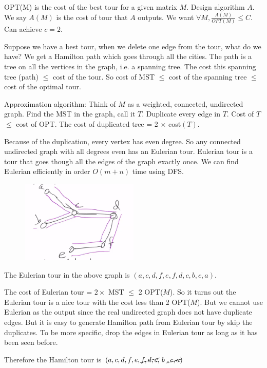 OPT(M) is the cost of the best tour for a given matrix $M$. Design algorithm $A$. We say $A(M)$ is the cost of tour that $A$ outputs. We want $\forall M, \frac{A(M)}{OPT(M)} \le C$. Can achieve $c = 2$.

Suppose we have a best tour, when we delete one edge from the tour, what do we have? We get a Hamilton path which goes through all the cities. The path is a tree on all the vertices in the graph, i.e. a spanning tree. The cost this spanning tree (path) $\le$ cost of the tour. So cost of MST $\le$ cost of the spanning tree $\le$ cost of the optimal tour.

Approximation algorithm:
Think of $M$ as a weighted, connected,  undirected graph. Find the MST in the graph, call it $T$. Duplicate every edge in $T$. Cost of $T$ $\le$ cost of OPT. The cost of duplicated tree = 2 $\times$ cost$(T)$.

Because of the duplication, every vertex has even degree. So any connected undirected graph with all degrees even has an Eulerian tour. Eulerian tour is a tour that goes though all the edges of the graph exactly once. We can find Eulerian efficiently in order $O(m+n)$ time using DFS.

\begin{figure}[H]
	\centering
	\includegraphics[width=0.5\textwidth]{fig/eulerian-tour.png}
\end{figure}

The Eulerian tour in the above graph is $(a, c, d, f, e, f, d, c, b, c, a)$. 

The cost of Eulerian tour = $2 \times$ MST $\le$ 2 OPT($M$). So it turns out the Eulerian tour is a nice tour with the cost less than 2 OPT($M$). But we cannot use Eulerian as the output since the real undirected graph does not have duplicate edges. But it is easy to generate Hamilton path from Eulerian tour by skip the duplicates. To be more specific, drop the edges in Eulerian tour as long as it has been seen before.

Therefore the Hamilton tour is $(a, c, d, f, e, \cancel{f, d, c,} ~b~\cancel{, c, a})$

